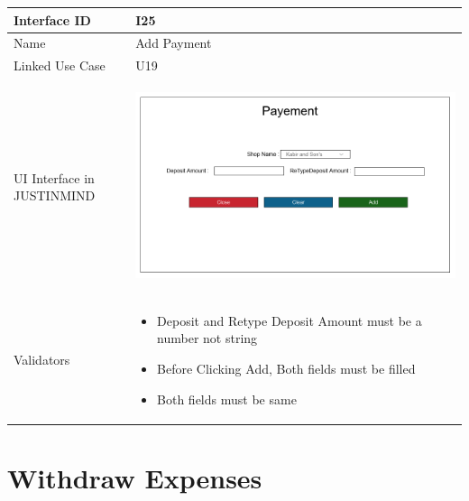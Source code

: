 \documentclass[12pt,a4paper]{report}
\begin{document}
\begin{tabular}{ | m{3cm} | m{12cm}| } \hline

Interface ID & I25  \\\hline

Name  &  Add Payment \\ \hline

Linked Use Case & U19	 \\ \hline

UI Interface in JUSTINMIND & \begin{center} \includegraphics[scale=0.3]{./UIs for Latex Reports/UI-026 Add Payment@1x.png}\end{center}  \\ \hline

Validators & 
\begin{itemize}
\item   Deposit and Retype Deposit Amount must be a number not string
\item  Before Clicking Add, Both fields must be filled
\item  Both fields must be same


\end{itemize}
\\ \hline

\end{tabular} 
\section{Withdraw Expenses }
\end{document}
